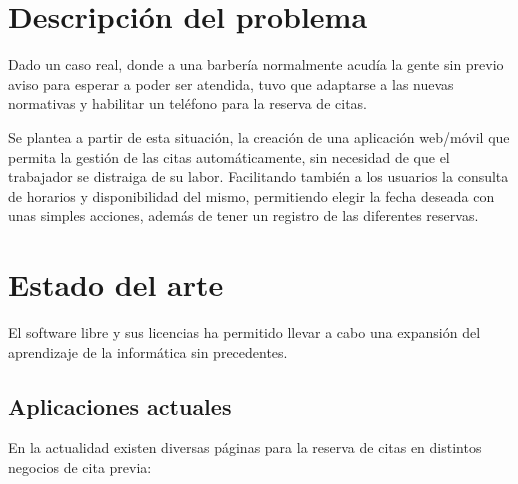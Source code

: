 \section{Descripción del problema}

Dado un caso real, donde a una barbería normalmente acudía la gente sin previo aviso para esperar a
poder ser atendida, tuvo que adaptarse a las nuevas normativas y habilitar un teléfono para la reserva de citas.

Se plantea a partir de esta situación, la creación de una aplicación web/móvil que permita la gestión de las citas
automáticamente, sin necesidad de que el trabajador se distraiga de su labor. Facilitando también a los usuarios la
consulta de horarios y disponibilidad del mismo, permitiendo elegir la fecha deseada con unas simples acciones,
además de tener un registro de las diferentes reservas.

\section{Estado del arte}

El software libre y sus licencias \cite{gplv3} ha permitido llevar a cabo una expansión del
aprendizaje de la informática sin precedentes.

\subsection{Aplicaciones actuales}

En la actualidad existen diversas páginas para la reserva de citas en distintos negocios de cita previa:

